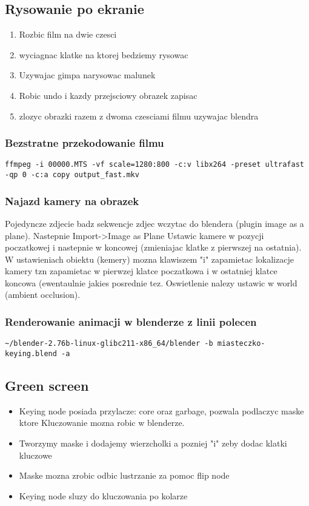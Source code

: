 \documentclass[a4paper,10pt]{article}
\begin{document}
\subsection{Rysowanie po ekranie}
\begin{enumerate}
\item Rozbic film na dwie czesci
\item wyciagnac klatke na ktorej bedziemy rysowac
\item Uzywajac gimpa narysowac malunek
\item Robic undo i kazdy przejsciowy obrazek zapisac
\item zlozyc obrazki razem z dwoma czesciami filmu uzywajac blendra 
\end{enumerate}
\subsubsection{Bezstratne przekodowanie filmu}
\begin{verbatim}
ffmpeg -i 00000.MTS -vf scale=1280:800 -c:v libx264 -preset ultrafast -qp 0 -c:a copy output_fast.mkv
\end{verbatim}

\subsubsection{Najazd kamery na obrazek}
Pojedyncze zdjecie badz sekwencje zdjec wczytac do blendera (plugin image as a plane). Nastepnie Import->Image as Plane
Ustawic kamere w pozycji poczatkowej i nastepnie w koncowej (zmieniajac klatke z pierwszej na ostatnia).
W ustawieniach obiektu (kemery) mozna klawiszem "i" zapamietac lokalizacje kamery tzn zapamietac w pierwzej klatce poczatkowa
i w ostatniej klatce koncowa (ewentaulnie jakies posrednie tez. 
Oswietlenie nalezy ustawic w world (ambient occlusion).

\subsubsection{Renderowanie animacji w blenderze z linii polecen}
\begin{verbatim}
~/blender-2.76b-linux-glibc211-x86_64/blender -b miasteczko-keying.blend -a
\end{verbatim}

\subsection{Green screen}
\begin{itemize}
\item Keying node posiada przylacze: core oraz garbage, pozwala podlaczyc maske ktore
Kluczowanie mozna robic w blenderze. 
\item Tworzymy maske i dodajemy wierzcholki a pozniej "i" zeby dodac klatki kluczowe  
\item Maske mozna zrobic odbic lustrzanie za pomoc flip node
\item Keying node sluzy do kluczowania po kolarze
\end{itemize}
\end{document}
